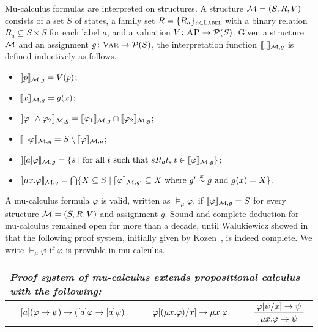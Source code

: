 \documentclass{amsart}
\begin{document}
Mu-calculus formulas are interpreted on structures.
A structure $\mathcal{M} = (S, R, V)$ consists of
a set $S$ of states,
a family set $R = \{R_a\}_{a \in \textsc{Label}}$ with a binary relation $R_a \subseteq
S \times S$
for each label $a$,
and a valuation $V \colon \textsc{AP} \to \mathcal{P}(S)$.
Given a structure $\mathcal{M}$ and an assignment $g \colon {\normalfont\textsc{Var}} \to \mathcal{P}(S)$,
the interpretation function
$\llbracket{\!\_\!}\rrbracket_{\mathcal{M},g}$ is defined inductively as follows.
\begin{itemize}
	\item $\llbracket p\rrbracket_{\mathcal{M},g} = V(p)$;
	\item $\llbracket x\rrbracket_{\mathcal{M},g} = g(x)$;
	\item $\llbracket\varphi_1 \wedge \varphi_2\rrbracket_{\mathcal{M},g} =
	\llbracket\varphi_1\rrbracket_{\mathcal{M},g} \cap
	\llbracket\varphi_2\rrbracket_{\mathcal{M},g}$;
	\item $\llbracket\neg \varphi\rrbracket_{\mathcal{M},g} =
	S \setminus \llbracket\varphi\rrbracket_{\mathcal{M},g}$;    
	\item $\llbracket[a]\varphi\rrbracket_{\mathcal{M},g} =
	\{ s \mid \text{for all $t$ such that $s R_a t$, 
		$t \in \llbracket\varphi\rrbracket_{\mathcal{M},g}$} \}$;
	\item $\llbracket\mu x . \varphi\rrbracket_{\mathcal{M},g} =
	\bigcap \{ X \subseteq S \mid \llbracket\varphi\rrbracket_{\mathcal{M},g'} \subseteq X
	\text{ where $g' \overset{x}{\sim} g$ and $g(x) = X$} \}$.
\end{itemize}
A mu-calculus formula $\varphi$ is valid, written as $\vDash_\mu \varphi$,
if $\llbracket\varphi\rrbracket_{\mathcal{M},g} = S$ for every structure $\mathcal{M} = (S,R,V)$ and
assignment $g$.
Sound and complete deduction for mu-calculus remained open for more than a
decade,
until Walukiewicz showed in~\cite{bibid} that
the following proof system, initially given by Kozen~\cite{bibid}, 
is indeed complete.
We write $\vdash_\mu \varphi$ if $\varphi$ is provable in mu-calculus.
\begin{center}
	\begin{tabular}{lllllm{2cm}}
		\multicolumn{6}{l}{\em Proof system of mu-calculus extends
			propositional calculus with the following:}
		\\\hline
		\prule{K}&
		$[a](\varphi \to \psi) \to
		([a]\varphi \to [a]\psi)$
		&
		\prule{Mu$_1$}&
		$\varphi[(\mu x . \varphi) / x] \to \mu x . \varphi$
		&
		\prule{Mu$_2$}&
		$\prftree{\varphi[\psi / x] \imp \psi}{\mu x . \varphi \imp \psi}$
	\end{tabular}
\end{center}
\end{document}
